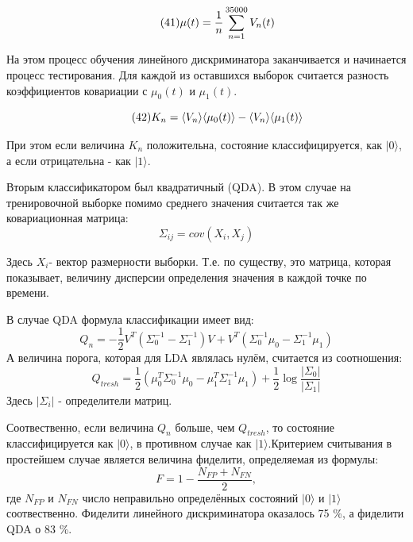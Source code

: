 \begin{equation}
\tag{41}
\mu(t) = \frac{1}{n}\sum_{n=1}^{35000} V_n(t)
\\
\end{equation}

На этом процесс обучения линейного дискриминатора заканчивается и начинается процесс тестирования. Для каждой из оставшихся выборок считается разность коэффициентов ковариации с $\mu_0(t)$ и $\mu_1(t)$.

\begin{equation}
\tag{42}
K_n = \langle V_n\rangle\langle\mu_0(t)\rangle - \langle V_n\rangle\langle\mu_1(t)\rangle
\\
\end{equation}

При этом если величина $K_n$ положительна, состояние классифицируется, как $|0\rangle$, а если отрицательна - как $|1\rangle$. 

Вторым классификатором был квадратичный (QDA). В этом случае на тренировочной выборке помимо среднего значения считается так же ковариационная матрица:
\begin{equation}
\tag{43}
\Sigma_{ij} = cov(X_i,X_j)
\end{equation}

Здесь $X_i$- вектор размерности выборки. Т.е. по существу, это матрица, которая показывает, величину дисперсии определения значения в каждой точке по времени.

В случае QDA формула классификации имеет вид:
\begin{equation}
\tag{45}
Q_n = -\frac{1}{2}V^T(\Sigma_0^{-1}- \Sigma_1^{-1})V+ V^T(\Sigma_0^{-1}\mu_0- \Sigma_1^{-1}\mu_1)
\end{equation}
А величина порога, которая для LDA являлась нулём, считается из соотношения:
\begin{equation}
\tag{46}
Q_{tresh}= \frac{1}{2}(\mu_0^T\Sigma_0^{-1}\mu_0 - \mu_1^T\Sigma_1^{-1}\mu_1)+\frac{1}{2}\log{\frac{|\Sigma_0|}{|\Sigma_1|}}
\end{equation}
Здесь $|\Sigma_i|$ - определители матриц. 

Соотвественно, если величина $Q_n$ больше, чем $Q_{tresh}$, то состояние классифицируется как $|0\rangle$, в противном случае как $|1\rangle$.Критерием считывания в простейшем случае является величина фиделити, определяемая из формулы:
\begin{equation}
\tag{47}
F = 1 -\frac{N_{FP}+N_{FN}}{2},
\end{equation}
\noindent где $N_{FP}$ и $N_{FN}$ число неправильно определённых состояний $|0\rangle$  и $|1\rangle$ соотвественно. Фиделити линейного дискриминатора оказалось 75 \%, а фиделити QDA о 83 \%.

